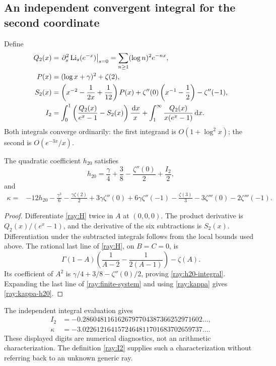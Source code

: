\subsection{An independent convergent integral for the second coordinate}

Define
\begin{align}
 Q_2(x)&=\left.\partial_s^2\operatorname{Li}_s(e^{-x})\right|_{s=0}
               =\sum_{n\ge1}(\log n)^2e^{-nx},\notag\\
 P(x)&=(\log x+\gamma)^2+\zeta(2),\notag\\
 S_2(x)&=\left(x^{-2}-\frac1{2x}+\frac1{12}\right)P(x)
             +\zeta''(0)\left(x^{-1}-\frac12\right)-\zeta''(-1),\notag\\
 I_2&=\int_0^1\left(\frac{Q_2(x)}{e^x-1}-S_2(x)\right)\frac{\,\mathrm d x}{x}
       +\int_1^\infty\frac{Q_2(x)}{x(e^x-1)}\,\mathrm d x.
 \label{ray:I2}
\end{align}
Both integrals converge ordinarily: the first integrand is
$O(1+\log^2x)$; the second is $O(e^{-3x}/x)$.

\begin{proposition}\label{prop:kappa-integral}
The quadratic coefficient $h_{20}$ satisfies
\begin{equation}\label{ray:h20-integral}
 h_{20}=\frac\gamma4+\frac38-\frac{\zeta''(0)}2+\frac{I_2}{2},
\end{equation}
and
\begin{align}
 \kappa={}&-12h_{20}-\frac{\gamma^3}{6}
       -\frac{\gamma\zeta(2)}2+3\gamma\zeta''(0)
       +6\gamma\zeta''(-1)-\frac{\zeta(3)}3
       -3\zeta'''(0)-2\zeta'''(-1).
 \label{ray:kappa-h20}
\end{align}
\end{proposition}
\begin{proof}
Differentiate \eqref{ray:H} twice in $A$ at $(0,0,0)$.
The product derivative is $Q_2(x)/(e^x-1)$, and the derivative of
the six subtractions is $S_2(x)$. Differentiation under the subtracted
integrals follows from the local bounds used above. The rational
last line of \eqref{ray:H}, on $B=C=0$, is
\[
 \Gamma(1-A)\left(\frac1{A-2}-\frac1{2(A-1)}\right)-\zeta(A).
\]
Its coefficient of $A^2$ is
$\gamma/4+3/8-\zeta''(0)/2$, proving
\eqref{ray:h20-integral}. Expanding the last line of
\eqref{ray:finite-system} and using \eqref{ray:kappa} gives
\eqref{ray:kappa-h20}.
\end{proof}

The independent integral evaluation gives
\begin{align*}
 I_2&=-0.2860481161626797704387366252971602\ldots,\\
 \kappa&=-3.0226121641572464811701683702659737\ldots.
\end{align*}
These displayed digits are numerical diagnostics, not an arithmetic
characterization. The definition \eqref{ray:I2} supplies such a
characterization without referring back to an unknown generic ray.

